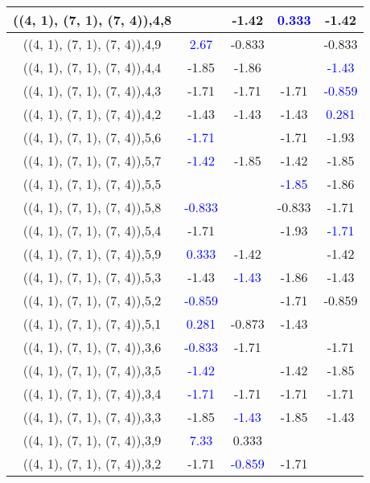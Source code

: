 \documentclass{article}
\begin{document}
\begin{center}
\begin{longtable}{|c|c|c|c|c|}
        	\hline
        	((4, 1), (7, 1), (7, 4)),4,8&&-1.42& \textcolor{blue}{0.333}&-1.42\\
        	\hline
        	((4, 1), (7, 1), (7, 4)),4,9& \textcolor{blue}{2.67}&-0.833&&-0.833\\
        	\hline
        	((4, 1), (7, 1), (7, 4)),4,4&-1.85&-1.86&& \textcolor{blue}{-1.43}\\
        	\hline
        	((4, 1), (7, 1), (7, 4)),4,3&-1.71&-1.71&-1.71& \textcolor{blue}{-0.859}\\
        	\hline
        	((4, 1), (7, 1), (7, 4)),4,2&-1.43&-1.43&-1.43& \textcolor{blue}{0.281}\\
        	\hline
        	((4, 1), (7, 1), (7, 4)),5,6& \textcolor{blue}{-1.71}&&-1.71&-1.93\\
        	\hline
        	((4, 1), (7, 1), (7, 4)),5,7& \textcolor{blue}{-1.42}&-1.85&-1.42&-1.85\\
        	\hline
        	((4, 1), (7, 1), (7, 4)),5,5&&& \textcolor{blue}{-1.85}&-1.86\\
        	\hline
        	((4, 1), (7, 1), (7, 4)),5,8& \textcolor{blue}{-0.833}&&-0.833&-1.71\\
        	\hline
        	((4, 1), (7, 1), (7, 4)),5,4&-1.71&&-1.93& \textcolor{blue}{-1.71}\\
        	\hline
        	((4, 1), (7, 1), (7, 4)),5,9& \textcolor{blue}{0.333}&-1.42&&-1.42\\
        	\hline
        	((4, 1), (7, 1), (7, 4)),5,3&-1.43& \textcolor{blue}{-1.43}&-1.86&-1.43\\
        	\hline
        	((4, 1), (7, 1), (7, 4)),5,2& \textcolor{blue}{-0.859}&&-1.71&-0.859\\
        	\hline
        	((4, 1), (7, 1), (7, 4)),5,1& \textcolor{blue}{0.281}&-0.873&-1.43&\\
        	\hline
        	((4, 1), (7, 1), (7, 4)),3,6& \textcolor{blue}{-0.833}&-1.71&&-1.71\\
        	\hline
        	((4, 1), (7, 1), (7, 4)),3,5& \textcolor{blue}{-1.42}&&-1.42&-1.85\\
        	\hline
        	((4, 1), (7, 1), (7, 4)),3,4& \textcolor{blue}{-1.71}&-1.71&-1.71&-1.71\\
        	\hline
        	((4, 1), (7, 1), (7, 4)),3,3&-1.85& \textcolor{blue}{-1.43}&-1.85&-1.43\\
        	\hline
        	((4, 1), (7, 1), (7, 4)),3,9& \textcolor{blue}{7.33}&0.333&&\\
        	\hline
        	((4, 1), (7, 1), (7, 4)),3,2&-1.71& \textcolor{blue}{-0.859}&-1.71&\\

\end{longtable}
\end{center}
\end{document}
